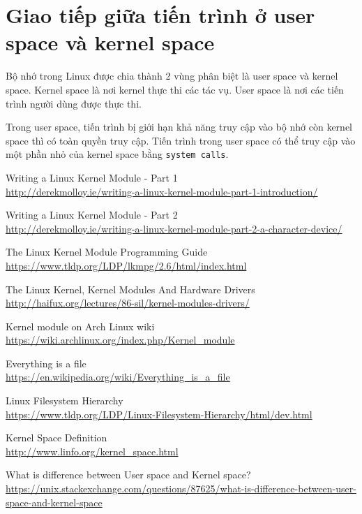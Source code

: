 \documentclass[12pt]{article}
\begin{document}
\section{Giao tiếp giữa tiến trình ở user space và kernel space}

Bộ nhớ trong Linux được chia thành 2 vùng phân biệt là user space và kernel space.
Kernel space là nơi kernel thực thi các tác vụ.
User space là nơi các tiến trình người dùng được thực thi.

Trong user space, tiến trình bị giới hạn khả năng truy cập vào bộ nhớ còn kernel space thì có toàn quyền truy cập.
Tiến trình trong user space có thể truy cập vào một phần nhỏ của kernel space bằng \texttt{system calls}.

\begin{thebibliography}{1}

 Writing a Linux Kernel Module - Part 1 \\
\url{http://derekmolloy.ie/writing-a-linux-kernel-module-part-1-introduction/}

  Writing a Linux Kernel Module - Part 2 \\
\url{http://derekmolloy.ie/writing-a-linux-kernel-module-part-2-a-character-device/}

 The Linux Kernel Module Programming Guide \\
\url{https://www.tldp.org/LDP/lkmpg/2.6/html/index.html}

 The Linux Kernel, Kernel Modules And Hardware Drivers \\
\url{http://haifux.org/lectures/86-sil/kernel-modules-drivers/}

 Kernel module on Arch Linux wiki \\
\url{https://wiki.archlinux.org/index.php/Kernel_module}

 Everything is a file \\
\url{https://en.wikipedia.org/wiki/Everything_is_a_file}

 Linux Filesystem Hierarchy \\
\url{https://www.tldp.org/LDP/Linux-Filesystem-Hierarchy/html/dev.html}

 Kernel Space Definition \\
\url{http://www.linfo.org/kernel_space.html}

 What is difference between User space and Kernel space? \\
\url{https://unix.stackexchange.com/questions/87625/what-is-difference-between-user-space-and-kernel-space}

\end{thebibliography}
\end{document}

